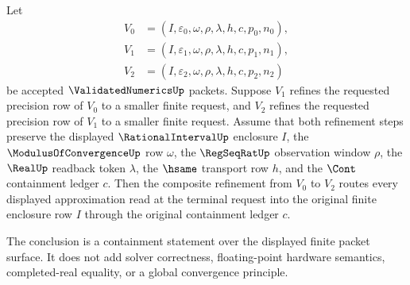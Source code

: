 \begin{theorem}
\label{thm:validatednumerics-refinement-composition-containment}
Let
$$
\begin{aligned}
V_0&=(I,\varepsilon_0,\omega,\rho,\lambda,h,c,p_0,n_0),\\
V_1&=(I,\varepsilon_1,\omega,\rho,\lambda,h,c,p_1,n_1),\\
V_2&=(I,\varepsilon_2,\omega,\rho,\lambda,h,c,p_2,n_2)
\end{aligned}
$$
be accepted $\ValidatedNumericsUp$ packets. Suppose $V_1$ refines the
requested precision row of $V_0$ to a smaller finite request, and $V_2$
refines the requested precision row of $V_1$ to a smaller finite request.
Assume that both refinement steps preserve the displayed
$\RationalIntervalUp$ enclosure $I$, the $\ModulusOfConvergenceUp$ row
$\omega$, the $\RegSeqRatUp$ observation window $\rho$, the $\RealUp$
readback token $\lambda$, the $\hsame$ transport row $h$, and the $\Cont$
containment ledger $c$. Then the composite refinement from $V_0$ to $V_2$
routes every displayed approximation read at the terminal request into the
original finite enclosure row $I$ through the original containment ledger
$c$.

The conclusion is a containment statement over the displayed finite packet
surface. It does not add solver correctness, floating-point hardware
semantics, completed-real equality, or a global convergence principle.
\end{theorem}
